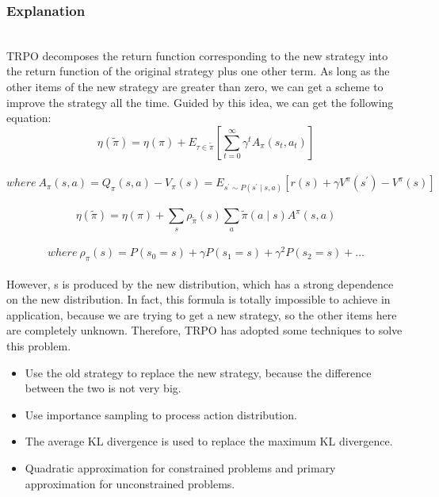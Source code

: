 \documentclass[12pt]{article}
\begin{document}
\subsubsection{Explanation}

~\\\indent TRPO decomposes the return function corresponding to the new strategy into the return function of the original strategy plus one other term. As long as the other items of the new strategy are greater than zero, we can get a scheme to improve the strategy all the time. Guided by this idea, we can get the following equation:
~\\$$\eta(\tilde{\pi})=\eta(\pi)+E_{\tau \in \tilde{\pi}}\left[\sum_{t=0}^{\infty} \gamma^{t} A_{\pi}\left(s_{t}, a_{t}\right)\right]$$
~\\$$where\ A_{\pi}(s, a)=Q_{\pi}(s, a)-V_{\pi}(s)=E_{s^{\prime} \sim P\left(s^{\prime} \mid s, a\right)}\left[r(s)+\gamma V^{\pi}\left(s^{\prime}\right)-V^{\pi}(s)\right]$$
~\\$$\eta(\tilde{\pi})=\eta(\pi)+\sum_{s} \rho_{\tilde{\pi}}(s) \sum_{a} \tilde{\pi}(a \mid s) A^{\pi}(s, a)$$
~\\$$where\ \rho_{\pi}(s)=P\left(s_{0}=s\right)+\gamma P\left(s_{1}=s\right)+\gamma^{2} P\left(s_{2}=s\right)+\ldots$$
~\\\indent However, s is produced by the new distribution, which has a strong dependence on the new distribution. In fact, this formula is totally impossible to achieve in application, because we are trying to get a new strategy, so the other items here are completely unknown. Therefore, TRPO has adopted some techniques to solve this problem.
\begin{itemize}
  \item Use the old strategy to replace the new strategy, because the difference between the two is not very big.
  \item Use importance sampling to process action distribution.
  \item The average KL divergence is used to replace the maximum KL divergence.
  \item Quadratic approximation for constrained problems and primary approximation for unconstrained problems.
\end{itemize}

\end{document}
